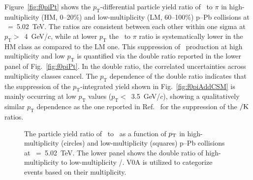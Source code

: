Figure~\ref{fig:f0piPt} shows the $p_{\mathrm{T}}$-differential particle yield ratio of \fzero~to $\pi$ in high-multiplicity (HM, 0--20\%) and low-multiplicity (LM, 60--100\%) p--Pb collisions at \snn~=~5.02~TeV. The ratios are consistent between each other within one sigma at $p_{\mathrm{T}}>$~4~GeV/$c$, while at lower $p_{\mathrm{T}}$ the \fzero~to $\pi$ ratio is systematically lower in the HM class as compared to the LM one. This suppression of \fzero~production at high multiplicity and low $p_{\mathrm{T}}$ is quantified via the double ratio reported in the lower panel of Fig.~\ref{fig:f0piPt}. In the double ratio, the correlated uncertainties across multiplicity classes cancel. The $p_{\mathrm{T}}$ dependence of the double ratio indicates that the suppression of the $p_{\mathrm{T}}$-integrated yield shown in Fig.~\ref{fig:f0piAddCSM} is mainly occurring at low $p_{\mathrm{T}}$ values ($p_{\mathrm{T}}<$~3.5~GeV/$c$), showing a qualitatively similar $p_{\mathrm{T}}$ dependence as the one reported in Ref.~\cite{ALICE:2019etb} for the suppression of the \kstar$\rm{}/K$ ratios.

\begin{figure}[!hbt]
	\centering
	\caption{The particle yield ratio of \fzero~to \kstar~as a function of $p_{\rm{T}}$ in high-multiplicity (circles) and low-multiplicity (squares) p--Pb collisions at \snn~=~5.02~TeV. The lower panel shows the double ratio of high-multiplicity to low-multiplicity \fzero/\kstar. V0A is utilized to categorize events based on their multiplicity. }
	\label{fig:f0KsPt}
\end{figure}

